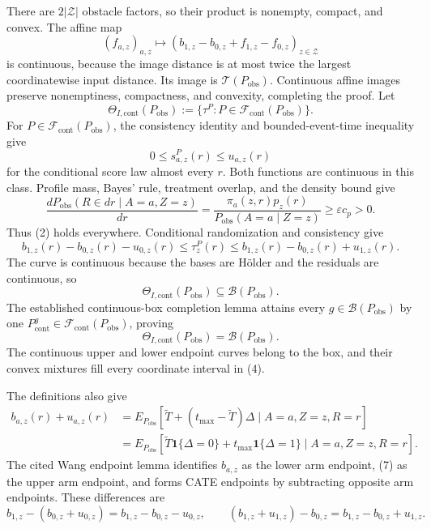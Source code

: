 There are \(2|\mathcal Z|\) obstacle factors, so their product is nonempty, compact, and convex.  The affine map
\[
(f_{a,z})_{a,z}\longmapsto
(b_{1,z}-b_{0,z}+f_{1,z}-f_{0,z})_{z\in\mathcal Z}
\tag{13}
\]
is continuous, because the image distance is at most twice the largest coordinatewise input distance.  Its image is \(\mathcal T(P_{\mathrm{obs}})\).  Continuous affine images preserve nonemptiness, compactness, and convexity, completing the proof.
Let
\[
\Theta_{I,\mathrm{cont}}(P_{\mathrm{obs}})
:=\{\tau^P:P\in\mathcal F_{\mathrm{cont}}(P_{\mathrm{obs}})\}.
\tag{1}
\]
For \(P\in\mathcal F_{\mathrm{cont}}(P_{\mathrm{obs}})\), the consistency identity and bounded-event-time inequality give
\[
0\leq s^P_{a,z}(r)\leq u_{a,z}(r)
\tag{2}
\]
for the conditional score law almost every \(r\).  Both functions are continuous in this class.  Profile mass, Bayes' rule, treatment overlap, and the density bound give
\[
\frac{dP_{\mathrm{obs}}(R\in dr\mid A=a,Z=z)}{dr}
=\frac{\pi_a(z,r)p_z(r)}
{P_{\mathrm{obs}}(A=a\mid Z=z)}
\geq\varepsilon c_p>0.
\tag{3}
\]
Thus (2) holds everywhere.  Conditional randomization and consistency give
\[
b_{1,z}(r)-b_{0,z}(r)-u_{0,z}(r)
\leq\tau_z^P(r)\leq
b_{1,z}(r)-b_{0,z}(r)+u_{1,z}(r).
\tag{4}
\]
The curve is continuous because the bases are H\"older and the residuals are continuous, so
\[
\Theta_{I,\mathrm{cont}}(P_{\mathrm{obs}})
\subseteq\mathcal B(P_{\mathrm{obs}}).
\tag{5}
\]
The established continuous-box completion lemma attains every \(g\in\mathcal B(P_{\mathrm{obs}})\) by one \(P^g_{\mathrm{cont}}\in\mathcal F_{\mathrm{cont}}(P_{\mathrm{obs}})\), proving
\[
\Theta_{I,\mathrm{cont}}(P_{\mathrm{obs}})
=\mathcal B(P_{\mathrm{obs}}).
\tag{6}
\]
The continuous upper and lower endpoint curves belong to the box, and their convex mixtures fill every coordinate interval in (4).

The definitions also give
\[
\begin{aligned}
b_{a,z}(r)+u_{a,z}(r)
&=E_{P_{\mathrm{obs}}}
[\widetilde T+(t_{\max}-\widetilde T)\Delta
\mid A=a,Z=z,R=r]\\
&=E_{P_{\mathrm{obs}}}
[\widetilde T\mathbf 1\{\Delta=0\}
+t_{\max}\mathbf 1\{\Delta=1\}
\mid A=a,Z=z,R=r].
\end{aligned}
\tag{7}
\]
The cited Wang endpoint lemma identifies \(b_{a,z}\) as the lower arm endpoint, (7) as the upper arm endpoint, and forms CATE endpoints by subtracting opposite arm endpoints.  These differences are
\[
b_{1,z}-(b_{0,z}+u_{0,z})=b_{1,z}-b_{0,z}-u_{0,z},
\qquad
(b_{1,z}+u_{1,z})-b_{0,z}=b_{1,z}-b_{0,z}+u_{1,z}.
\tag{8}
\]


